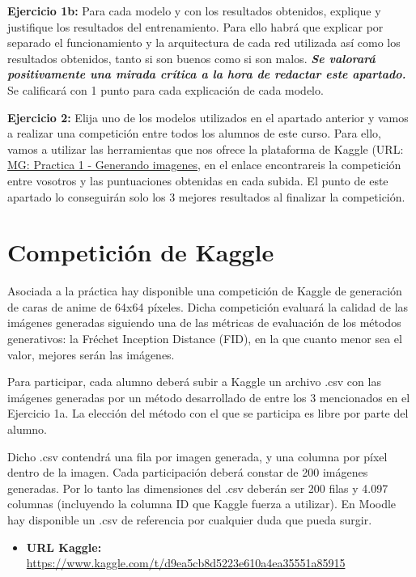 \documentclass[a4paper]{article}
\begin{document}
\textbf{Ejercicio 1b:} Para cada modelo y con los resultados obtenidos, explique y justifique los resultados del entrenamiento. Para ello habrá que explicar por separado el funcionamiento y la arquitectura de cada red utilizada así como los resultados obtenidos, tanto si son buenos como si son malos. \textbf{\textit{Se valorará positivamente una mirada crítica a la hora de redactar este apartado.}}
Se calificará con 1 punto para cada explicación de cada modelo.

\textbf{Ejercicio 2:} Elija uno de los modelos utilizados en el apartado anterior y vamos a realizar una competición entre todos los alumnos de este curso. Para ello, vamos a utilizar las herramientas que nos ofrece la plataforma de Kaggle (URL: \href{https://www.kaggle.com/competitions/mg-practica-1-generando-imagenes/data}{MG: Practica 1 - Generando imagenes}, en el enlace encontrareis la competición entre vosotros y las puntuaciones obtenidas en cada subida. El punto de este apartado lo conseguirán solo los 3 mejores resultados al finalizar la competición.

\section{Competición de Kaggle}
Asociada a la práctica hay disponible una competición de Kaggle de generación de caras de anime de 64x64 píxeles. Dicha competición evaluará la calidad de las imágenes generadas siguiendo una de las métricas de evaluación de los métodos generativos: la Fréchet Inception Distance (FID), en la que cuanto menor sea el valor, mejores serán las imágenes.

Para participar, cada alumno deberá subir a Kaggle un archivo .csv con las imágenes generadas por un método desarrollado de entre los 3 mencionados en el Ejercicio 1a. La elección del método con el que se participa es libre por parte del alumno.

Dicho .csv contendrá una fila por imagen generada, y una columna por píxel dentro de la imagen. Cada participación deberá constar de 200 imágenes generadas. Por lo tanto las dimensiones del .csv deberán ser 200 filas y 4.097 columnas (incluyendo la columna ID que Kaggle fuerza a utilizar). En Moodle hay disponible un .csv de referencia por cualquier duda que pueda surgir.

\begin{itemize}
    \item \textbf{URL Kaggle:} \href{https://www.kaggle.com/t/d9ea5cb8d5223e610a4ea35551a85915}{https://www.kaggle.com/t/d9ea5cb8d5223e610a4ea35551a85915}
\end{itemize}
\end{document}
